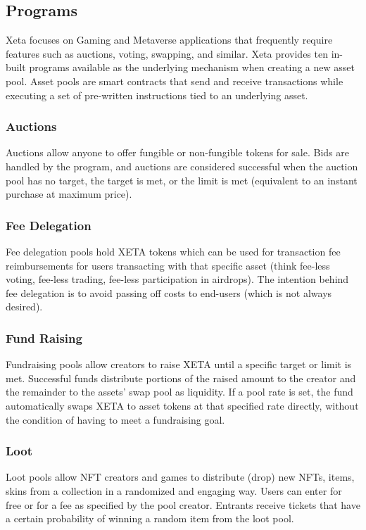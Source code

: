 \documentclass{article}
\begin{document}
\subsection{Programs}
Xeta focuses on Gaming and Metaverse applications that frequently require features such as auctions, voting, swapping, and similar. Xeta provides ten in-built programs available as the underlying mechanism when creating a new asset pool. Asset pools are smart contracts that send and receive transactions while executing a set of pre-written instructions tied to an underlying asset.

\subsubsection{Auctions}
Auctions allow anyone to offer fungible or non-fungible tokens for sale. Bids are handled by the program, and auctions are considered successful when the auction pool has no target, the target is met, or the limit is met (equivalent to an instant purchase at maximum price).

\subsubsection{Fee Delegation}
Fee delegation pools hold XETA tokens which can be used for transaction fee reimbursements for users transacting with that specific asset (think fee-less voting, fee-less trading, fee-less participation in airdrops). The intention behind fee delegation is to avoid passing off costs to end-users (which is not always desired).

\subsubsection{Fund Raising}
Fundraising pools allow creators to raise XETA until a specific target or limit is met. Successful funds distribute portions of the raised amount to the creator and the remainder to the assets' swap pool as liquidity. If a pool rate is set, the fund automatically swaps XETA to asset tokens at that specified rate directly, without the condition of having to meet a fundraising goal.

\subsubsection{Loot}
Loot pools allow NFT creators and games to distribute (drop) new NFTs, items, skins from a collection in a randomized and engaging way. Users can enter for free or for a fee as specified by the pool creator. Entrants receive tickets that have a certain probability of winning a random item from the loot pool.
\end{document}
